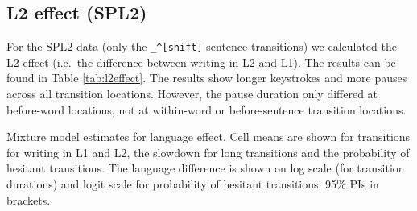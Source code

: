 \clearpage
\makeatletter
\efloat@restorefloats
\makeatother


\begin{appendix}
\section{}
\hypertarget{l2-effect-spl2}{%
\subsection{L2 effect (SPL2)}\label{l2-effect-spl2}}

For the SPL2 data (only the \texttt{\_\^{}{[}shift{]}}
sentence-transitions) we calculated the L2 effect (i.e.~the difference
between writing in L2 and L1). The results can be found in Table
\ref{tab:l2effect}. The results show longer keystrokes and more pauses
across all transition locations. However, the pause duration only
differed at before-word locations, not at within-word or before-sentence
transition locations.

\begin{table}[tbp]

\begin{center}
\begin{threeparttable}

\caption{\label{tab:l2effect}Mixture model estimates for language effect. Cell means are shown for transitions for writing in L1 and L2, the slowdown for long transitions and the probability of hesitant transitions. The language difference is shown on log scale (for transition durations) and logit scale for probability of hesitant transitions. 95\% PIs in brackets.}

\small{

}
\end{threeparttable}
\end{center}
\end{table}
\end{appendix}
